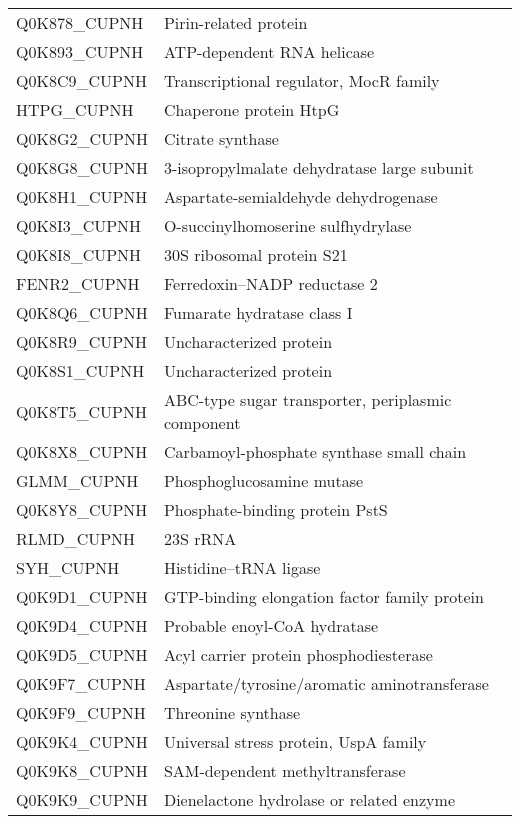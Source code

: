 \begin{center}
\begin{longtable}{ l l }
Q0K878\_CUPNH & Pirin-related protein \\ [0.5ex]
Q0K893\_CUPNH & ATP-dependent RNA helicase \\ [0.5ex]
Q0K8C9\_CUPNH & Transcriptional regulator, MocR family \\ [0.5ex]
HTPG\_CUPNH & Chaperone protein HtpG \\ [0.5ex]
Q0K8G2\_CUPNH & Citrate synthase \\ [0.5ex]
Q0K8G8\_CUPNH & 3-isopropylmalate dehydratase large subunit \\ [0.5ex]
Q0K8H1\_CUPNH & Aspartate-semialdehyde dehydrogenase \\ [0.5ex]
Q0K8I3\_CUPNH & O-succinylhomoserine sulfhydrylase \\ [0.5ex]
Q0K8I8\_CUPNH & 30S ribosomal protein S21 \\ [0.5ex]
FENR2\_CUPNH & Ferredoxin--NADP reductase 2 \\ [0.5ex]
Q0K8Q6\_CUPNH & Fumarate hydratase class I \\ [0.5ex]
Q0K8R9\_CUPNH & Uncharacterized protein \\ [0.5ex]
Q0K8S1\_CUPNH & Uncharacterized protein \\ [0.5ex]
Q0K8T5\_CUPNH & ABC-type sugar transporter, periplasmic component \\ [0.5ex]
Q0K8X8\_CUPNH & Carbamoyl-phosphate synthase small chain \\ [0.5ex]
GLMM\_CUPNH & Phosphoglucosamine mutase \\ [0.5ex]
Q0K8Y8\_CUPNH & Phosphate-binding protein PstS \\ [0.5ex]
RLMD\_CUPNH & 23S rRNA \\ [0.5ex]
SYH\_CUPNH & Histidine--tRNA ligase \\ [0.5ex]
Q0K9D1\_CUPNH & GTP-binding elongation factor family protein \\ [0.5ex]
Q0K9D4\_CUPNH & Probable enoyl-CoA hydratase \\ [0.5ex]
Q0K9D5\_CUPNH & Acyl carrier protein phosphodiesterase \\ [0.5ex]
Q0K9F7\_CUPNH & Aspartate/tyrosine/aromatic aminotransferase \\ [0.5ex]
Q0K9F9\_CUPNH & Threonine synthase \\ [0.5ex]
Q0K9K4\_CUPNH & Universal stress protein, UspA family \\ [0.5ex]
Q0K9K8\_CUPNH & SAM-dependent methyltransferase \\ [0.5ex]
Q0K9K9\_CUPNH & Dienelactone hydrolase or related enzyme \\ [0.5ex]

\end{longtable}
\end{center}

